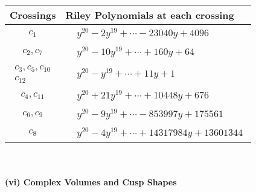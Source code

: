 \documentclass[1p]{elsarticle_modified}
\theoremstyle{definition}
\begin{document}
\begin{tabular}{m{50pt}|m{274pt}}
Crossings & \hspace{64pt}Riley Polynomials at each crossing \\
\hline $$\begin{aligned}c_{1}\end{aligned}$$&$\begin{aligned}
&y^{20}-2 y^{19}+\cdots-23040 y+4096
\end{aligned}$\\
\hline $$\begin{aligned}c_{2},c_{7}\end{aligned}$$&$\begin{aligned}
&y^{20}-10 y^{19}+\cdots+160 y+64
\end{aligned}$\\
\hline $$\begin{aligned}c_{3},c_{5},c_{10}\\c_{12}\end{aligned}$$&$\begin{aligned}
&y^{20}- y^{19}+\cdots+11 y+1
\end{aligned}$\\
\hline $$\begin{aligned}c_{4},c_{11}\end{aligned}$$&$\begin{aligned}
&y^{20}+21 y^{19}+\cdots+10448 y+676
\end{aligned}$\\
\hline $$\begin{aligned}c_{6},c_{9}\end{aligned}$$&$\begin{aligned}
&y^{20}-9 y^{19}+\cdots-853997 y+175561
\end{aligned}$\\
\hline $$\begin{aligned}c_{8}\end{aligned}$$&$\begin{aligned}
&y^{20}-4 y^{19}+\cdots+14317984 y+13601344
\end{aligned}$\\
\hline
\end{tabular}\\~\\
\newpage\flushleft \textbf{(vi) Complex Volumes and Cusp Shapes}
\end{document}

